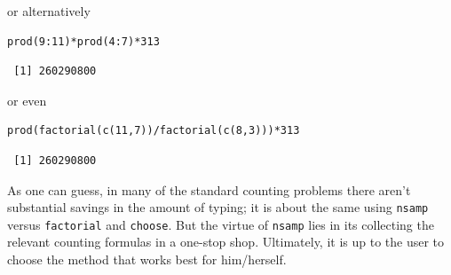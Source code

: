 \documentclass[captions=tableheading]{scrbook}
\begin{document}
\begin{example}
or alternatively 


\lstset{language=R}
\begin{lstlisting}
prod(9:11)*prod(4:7)*313
\end{lstlisting}

\begin{verbatim}
 [1] 260290800
\end{verbatim}

or even 


\lstset{language=R}
\begin{lstlisting}
prod(factorial(c(11,7))/factorial(c(8,3)))*313
\end{lstlisting}

\begin{verbatim}
 [1] 260290800
\end{verbatim}

\end{example}

As one can guess, in many of the standard counting problems there aren't substantial savings in the amount of typing; it is about the same using \texttt{nsamp} versus \texttt{factorial} and \texttt{choose}. But the virtue of \texttt{nsamp} lies in its collecting the relevant counting formulas in a one-stop shop. Ultimately, it is up to the user to choose the method that works best for him/herself. 
\end{document}
